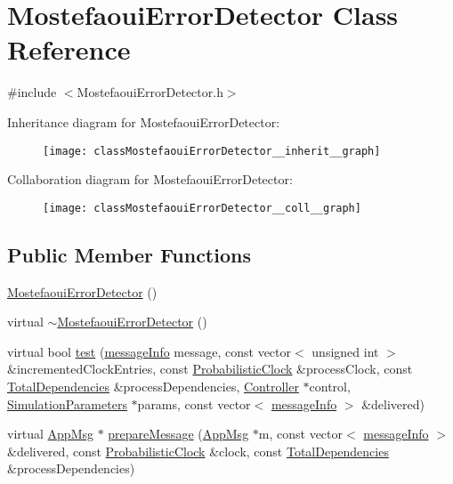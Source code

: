 \hypertarget{classMostefaouiErrorDetector}{}\section{Mostefaoui\+Error\+Detector Class Reference}
\label{classMostefaouiErrorDetector}


{\ttfamily \#include $<$Mostefaoui\+Error\+Detector.\+h$>$}



Inheritance diagram for Mostefaoui\+Error\+Detector\+:\nopagebreak
\begin{figure}[H]
\begin{center}
\leavevmode
\texttt{[image: classMostefaouiErrorDetector\_\_inherit\_\_graph]}
\end{center}
\end{figure}


Collaboration diagram for Mostefaoui\+Error\+Detector\+:\nopagebreak
\begin{figure}[H]
\begin{center}
\leavevmode
\texttt{[image: classMostefaouiErrorDetector\_\_coll\_\_graph]}
\end{center}
\end{figure}
\subsection*{Public Member Functions}
\begin{DoxyCompactItemize}
\item 
\hyperlink{classMostefaouiErrorDetector_a2a76ea0d2e986ce379c5686f48f887dc}{Mostefaoui\+Error\+Detector} ()
\item 
virtual \hyperlink{classMostefaouiErrorDetector_a8658848d90c291c1364962c0759ca806}{$\sim$\+Mostefaoui\+Error\+Detector} ()
\item 
virtual bool \hyperlink{classMostefaouiErrorDetector_a293f6cf144526bc8694fc4f1fc0daeb5}{test} (\hyperlink{structures_8h_a7e7bdc1d2fff8a9436f2f352b2711ed6}{message\+Info} message, const vector$<$ unsigned int $>$ \&incremented\+Clock\+Entries, const \hyperlink{classProbabilisticClock}{Probabilistic\+Clock} \&process\+Clock, const \hyperlink{classTotalDependencies}{Total\+Dependencies} \&process\+Dependencies, \hyperlink{classController}{Controller} $\ast$control, \hyperlink{classSimulationParameters}{Simulation\+Parameters} $\ast$params, const vector$<$ \hyperlink{structures_8h_a7e7bdc1d2fff8a9436f2f352b2711ed6}{message\+Info} $>$ \&delivered)
\item 
virtual \hyperlink{classAppMsg}{App\+Msg} $\ast$ \hyperlink{classMostefaouiErrorDetector_adcd530d7349df19adb614ca414225214}{prepare\+Message} (\hyperlink{classAppMsg}{App\+Msg} $\ast$m, const vector$<$ \hyperlink{structures_8h_a7e7bdc1d2fff8a9436f2f352b2711ed6}{message\+Info} $>$ \&delivered, const \hyperlink{classProbabilisticClock}{Probabilistic\+Clock} \&clock, const \hyperlink{classTotalDependencies}{Total\+Dependencies} \&process\+Dependencies)
\end{DoxyCompactItemize}


